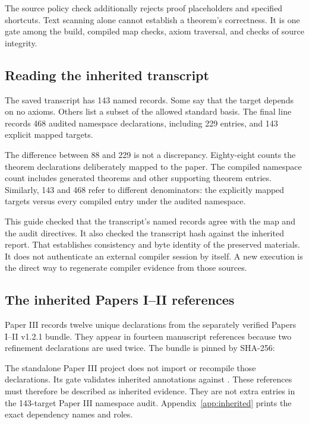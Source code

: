 The source policy check additionally rejects proof placeholders and specified shortcuts. Text scanning alone cannot establish a theorem's correctness. It is one gate among the build, compiled map checks, axiom traversal, and checks of source integrity.

\subsection{Reading the inherited transcript}
The saved transcript has 143 named records. Some say that the target depends on no axioms. Others list a subset of the allowed standard basis. The final line records 468 audited namespace declarations, including 229  entries, and 143 explicit mapped targets.

The difference between 88 and 229 is not a discrepancy. Eighty-eight counts the theorem declarations deliberately mapped to the paper. The compiled namespace count includes generated theorems and other supporting theorem entries. Similarly, 143 and 468 refer to different denominators: the explicitly mapped targets versus every compiled entry under the audited namespace.

This guide checked that the transcript's named records agree with the map and the audit directives. It also checked the transcript hash against the inherited report. That establishes consistency and byte identity of the preserved materials. It does not authenticate an external compiler session by itself. A new execution is the direct way to regenerate compiler evidence from those sources.

\subsection{The inherited Papers I--II references}
Paper III records twelve unique declarations from the separately verified Papers I--II v1.2.1 bundle. They appear in fourteen manuscript references because two refinement declarations are used twice. The bundle is pinned by SHA-256:

{\small{}}

The standalone Paper III project does not import or recompile those declarations. Its gate validates inherited annotations against . These references must therefore be described as inherited evidence. They are not extra entries in the 143-target Paper III namespace audit. Appendix~\ref{app:inherited} prints the exact dependency names and roles.

